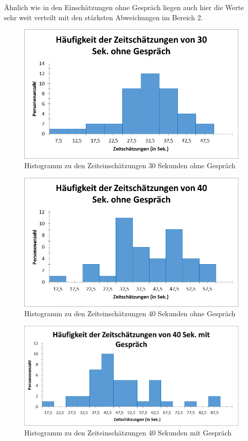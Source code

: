 \documentclass{Paper}
\begin{document}
Ähnlich wie in den Einschätzungen ohne Gespräch liegen auch hier die Werte sehr weit verteilt mit den stärksten Abweichungen im Bereich 2.


\begin{figure}[H]
	\centering
	\includegraphics[scale=0.7]{../Diagramme/histopost/30ohne_variante3.png}
	\caption{Histogramm zu den Zeiteinschätzungen 30 Sekunden ohne Gespräch}
	\label{img:histpost30}
\end{figure}
\begin{figure}[H]
	\centering
	\includegraphics[scale=0.7]{../Diagramme/histopost/40ohne_variante3.png}
	\caption{Histogramm zu den Zeiteinschätzungen 40 Sekunden ohne Gespräch}
	\label{img:histpost40ohne}
\end{figure}
\begin{figure}[H]
	\centering
	\includegraphics[scale=0.7]{../Diagramme/histopost/40mit_variante3.png}
	\caption{Histogramm zu den Zeiteinschätzungen 40 Sekunden mit Gespräch}
	\label{img:histpost40mit}
\end{figure}
\end{document}
